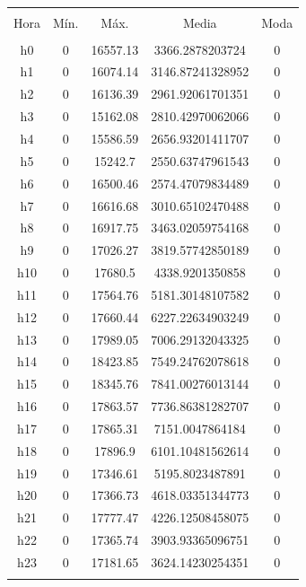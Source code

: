 \documentclass[conference, 10pt]{IEEEtran}
\begin{document}
\begin{table}[!htbp] \centering 
  \caption{} 
  \label{} 
\begin{tabular}{@{\extracolsep{5pt}} ccccc} 
\\[-1.8ex]\hline 
\hline \\[-1.8ex] 
Hora & Mín. & Máx. & Media & Moda \\ 
\hline \\[-1.8ex] 
h0 & 0 & 16557.13 & 3366.2878203724 & 0 \\ 
h1 & 0 & 16074.14 & 3146.87241328952 & 0 \\ 
h2 & 0 & 16136.39 & 2961.92061701351 & 0 \\ 
h3 & 0 & 15162.08 & 2810.42970062066 & 0 \\ 
h4 & 0 & 15586.59 & 2656.93201411707 & 0 \\ 
h5 & 0 & 15242.7 & 2550.63747961543 & 0 \\ 
h6 & 0 & 16500.46 & 2574.47079834489 & 0 \\ 
h7 & 0 & 16616.68 & 3010.65102470488 & 0 \\ 
h8 & 0 & 16917.75 & 3463.02059754168 & 0 \\ 
h9 & 0 & 17026.27 & 3819.57742850189 & 0 \\ 
h10 & 0 & 17680.5 & 4338.9201350858 & 0 \\ 
h11 & 0 & 17564.76 & 5181.30148107582 & 0 \\ 
h12 & 0 & 17660.44 & 6227.22634903249 & 0 \\ 
h13 & 0 & 17989.05 & 7006.29132043325 & 0 \\ 
h14 & 0 & 18423.85 & 7549.24762078618 & 0 \\ 
h15 & 0 & 18345.76 & 7841.00276013144 & 0 \\ 
h16 & 0 & 17863.57 & 7736.86381282707 & 0 \\ 
h17 & 0 & 17865.31 & 7151.0047864184 & 0 \\ 
h18 & 0 & 17896.9 & 6101.10481562614 & 0 \\ 
h19 & 0 & 17346.61 & 5195.8023487891 & 0 \\ 
h20 & 0 & 17366.73 & 4618.03351344773 & 0 \\ 
h21 & 0 & 17777.47 & 4226.12508458075 & 0 \\ 
h22 & 0 & 17365.74 & 3903.93365096751 & 0 \\ 
h23 & 0 & 17181.65 & 3624.14230254351 & 0 \\ 
\hline \\[-1.8ex] 
\end{tabular} 
\end{table}
\end{document}
